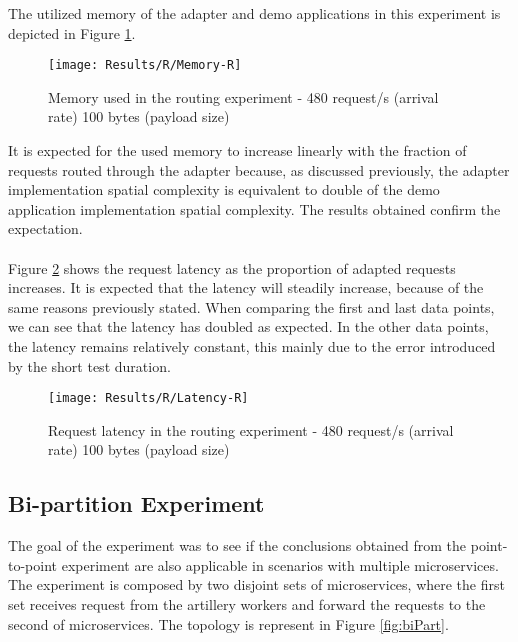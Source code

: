 The utilized memory of the adapter and demo applications in this experiment is depicted in Figure \ref{fig:routMem}.

\begin{figure}[htbp]
    \centering
    \centerline{\texttt{[image: Results/R/Memory-R]}}
    \caption{Memory used in the routing experiment - 480 request/s (arrival rate) 100 bytes (payload size)}
    \label{fig:routMem}
\end{figure}

It is expected for the used memory to increase linearly with the fraction of requests routed through the adapter because, as discussed previously,
the adapter implementation spatial complexity is equivalent to double of the demo application implementation spatial complexity.
The results obtained confirm the expectation.

\paragraph{}

Figure \ref{fig:routLatency} shows the request latency as the proportion of adapted requests increases.
It is expected that the latency will steadily increase, because of the same reasons previously stated.
When comparing the first and last data points, we can see that the latency has doubled as expected.
In the other data points, the latency remains relatively constant, this mainly due to the error introduced by the short test duration.

\begin{figure}[htbp]
    \centering
    \centerline{\texttt{[image: Results/R/Latency-R]}}
    \caption{Request latency in the routing experiment - 480 request/s (arrival rate) 100 bytes (payload size)}
    \label{fig:routLatency}
\end{figure}

\subsection{Bi-partition Experiment}

The goal of the experiment was to see if the conclusions obtained from the point-to-point experiment are also applicable in scenarios with multiple microservices.
The experiment is composed by two disjoint sets of microservices, where the first set receives request from the artillery workers and forward the requests to the second of microservices.
The topology is represent in Figure \ref{fig:biPart}.

